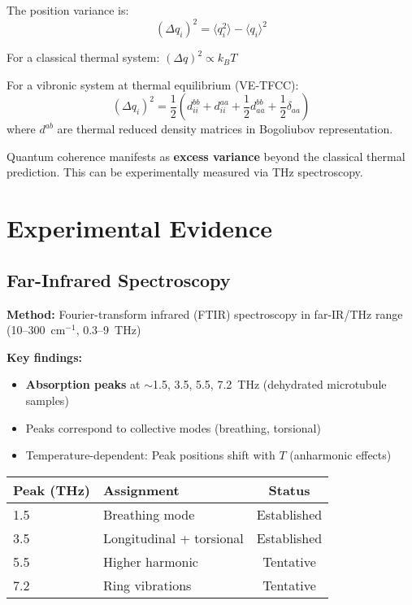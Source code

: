The position variance is:
\begin{equation}
(\Delta q_i)^2 = \langle q_i^2 \rangle - \langle q_i \rangle^2
\label{eq:position-variance}
\end{equation}

For a classical thermal system: $(\Delta q)^2 \propto k_B T$

For a vibronic system at thermal equilibrium (VE-TFCC):
\begin{equation}
(\Delta q_i)^2 = \frac{1}{2} \left( d_{ii}^{bb} + d_{ii}^{aa} + \frac{1}{2} d_{aa}^{bb} + \frac{1}{2} \delta_{aa} \right)
\label{eq:vibronic-variance}
\end{equation}
where $d^{ab}$ are thermal reduced density matrices in Bogoliubov representation.

\begin{keyconcept}
Quantum coherence manifests as \textbf{excess variance} beyond the classical thermal prediction. This can be experimentally measured via THz spectroscopy.
\end{keyconcept}

\section{Experimental Evidence}

\subsection{Far-Infrared Spectroscopy}

\textbf{Method:} Fourier-transform infrared (FTIR) spectroscopy in far-IR/THz range (10--300~cm$^{-1}$, 0.3--9~THz)

\textbf{Key findings:}
\begin{itemize}
\item \textbf{Absorption peaks} at $\sim$1.5, 3.5, 5.5, 7.2~THz (dehydrated microtubule samples)
\item Peaks correspond to collective modes (breathing, torsional)
\item Temperature-dependent: Peak positions shift with $T$ (anharmonic effects)
\end{itemize}

\begin{center}
\begin{tabular}{@{}llc@{}}
\toprule
\textbf{Peak (THz)} & \textbf{Assignment} & \textbf{Status} \\
\midrule
1.5 & Breathing mode & Established \\
3.5 & Longitudinal + torsional & Established \\
5.5 & Higher harmonic & Tentative \\
7.2 & Ring vibrations & Tentative \\
\bottomrule
\end{tabular}
\end{center}

